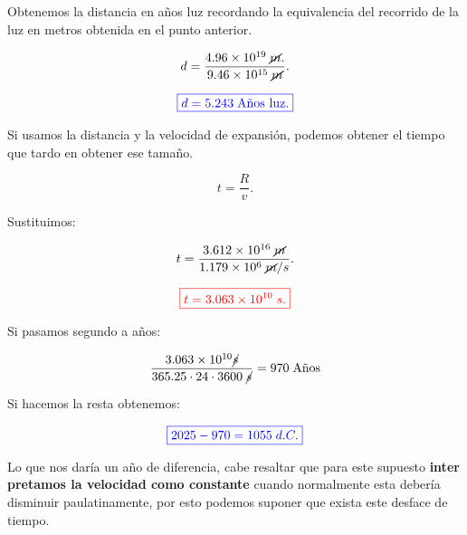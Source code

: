 \documentclass[a4paper,12pt]{article} %
\begin{document}
\vspace{\baselineskip}

\begin{justify}
    Obtenemos la distancia en años luz recordando la equivalencia del recorrido de la luz en metros obtenida en el punto anterior.
\end{justify}

\[ d = \frac{4.96 \times 10^{19} \; \cancel{m}.}{9.46 \times 10^{15} \; \cancel{m}} . \]

\vspace{\baselineskip}

\[ \textcolor{blue}{\boxed{d = 5.243 \; \text{Años luz.}}} \]

\begin{justify}
    Si usamos la distancia y la velocidad de expansión, podemos obtener el tiempo que tardo en obtener ese tamaño.
\end{justify}

\[  t = \frac{R}{v}. \]

\begin{justify}
    Sustituimos:
\end{justify}

\[ t = \frac{3.612 \times 10^{16} \; \cancel{m}}{1.179 \times 10^6 \; \cancel{m}/s}. \]

\vspace{\baselineskip}

\[ \textcolor{red}{\boxed{t = 3.063 \times 10^{10} \;s.}}  \]

\vspace{\baselineskip}

\begin{justify}
    Si pasamos segundo a años:
\end{justify}

\[ \frac{3.063 \times 10^{10} \cancel{s} }{365.25 \cdot 24 \cdot 3600 \; \cancel{s}} = 970 \; \text{Años} \]

\begin{justify}
    Si hacemos la resta obtenemos:
\end{justify}

\[ \textcolor{blue}{\boxed{2025 - 970 = 1055 \; d.C.}}\]

\begin{justify}
    Lo que nos daría un año de diferencia, cabe resaltar que para este supuesto \textbf{inter pretamos la velocidad como constante} cuando 
    normalmente esta debería disminuir paulatinamente, por esto podemos suponer que exista este desface de tiempo.
\end{justify}
\end{document}
